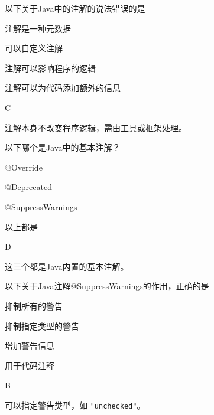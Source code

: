 \begin{question}
	以下关于Java中的注解的说法错误的是
	\begin{options}
		\item 注解是一种元数据
		\item 可以自定义注解
		\item 注解可以影响程序的逻辑
		\item 注解可以为代码添加额外的信息
	\end{options}
	\begin{answer}
		C
	\end{answer}
	\begin{explanation}
		注解本身不改变程序逻辑，需由工具或框架处理。
	\end{explanation}
\end{question}

\begin{question}
	以下哪个是Java中的基本注解？
	\begin{options}
		\item @Override
		\item @Deprecated
		\item @SuppressWarnings
		\item 以上都是
	\end{options}
	\begin{answer}
		D
	\end{answer}
	\begin{explanation}
		这三个都是Java内置的基本注解。
	\end{explanation}
\end{question}

\begin{question}
	以下关于Java注解@SuppressWarnings的作用，正确的是
	\begin{options}
		\item 抑制所有的警告
		\item 抑制指定类型的警告
		\item 增加警告信息
		\item 用于代码注释
	\end{options}
	\begin{answer}
		B
	\end{answer}
	\begin{explanation}
		可以指定警告类型，如 \texttt{"unchecked"}。
	\end{explanation}
\end{question}

